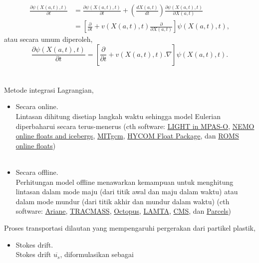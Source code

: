 \documentclass{beamer}
\begin{document}
\begin{frame}[allowframebreaks]
\begin{equation*}
		\begin{aligned}
			\frac{\partial \psi(X(a,t),t)}{\partial t}&=\frac{\partial \psi(X(a,t),t)}{\partial t} + \left(\frac{dX(a,t)}{dt}\right)\frac{\partial \psi(X(a,t),t)}{\partial X(a,t)}  \\
			&= \left[\frac{\partial}{\partial t} + v(X(a,t),t)\frac{\partial}{\partial X(a,t)}\right]\psi(X(a,t),t),
		\end{aligned}
	\end{equation*}
	atau secara umum diperoleh,
	\begin{equation}
		\frac{\partial \psi(X(a,t),t)}{\partial t}=\left[\frac{\partial}{\partial t}+v(X(a,t),t).\nabla\right]\psi(X(a,t),t).
	\end{equation}
	\newpage
	$\;$ \\
	$\;$ \\ 
	Metode integrasi Lagrangian, 
	\begin{itemize}
		\item Secara online. \\ \vspace{.5pt}
		\tiny Lintasan dihitung disetiap langkah waktu sehingga model Eulerian diperbaharui secara terus-menerus (cth software: \href{mpas-dev.github.io}{LIGHT in MPAS-O}, \href{nemo-ocean.eu/About-NEMO/Reference-manuals}{NEMO online floats and icebergs}, \href{mitgcm.org}{MITgcm}, \href{hycom.org}{HYCOM Float Package}, dan \href{myroms.org/wiki/floats.in}{ROMS online floats}) \\ \vspace{-5.5pt} $\;$ \normalsize
		\item Secara offline. \\
		\tiny Perhitungan model offline menawarkan kemampuan untuk menghitung lintasan dalam mode maju (dari titik awal dan maju dalam waktu) atau dalam mode mundur (dari titik akhir dan mundur dalam waktu) (cth software: \href{https://www.univ-brest.fr/lpo/ariane}{Ariane}, \href{tracmass.org}{TRACMASS}, \href{https://github.com/jinbow/Octopus}{Octopus}, \href{https://bitbucket.org/f_nencio/spasso/overview}{LAMTA}, \href{https://github.com/beatrixparis/connectivity-modeling-system}{CMS}, dan \href{oceanparcels.org}{Parcels})
	\end{itemize}
	\newpage
	Proses transportasi dilautan yang mempengaruhi pergerakan dari partikel plastik,
	\begin{itemize}
		\item Stokes drift. \\ \vspace{.5pt}
		\tiny Stokes drift $\overline{u_s}$, diformulasikan sebagai 

\end{itemize}
\end{frame}
\end{document}
